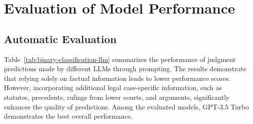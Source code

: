 \section{Evaluation of Model Performance}
% 
\subsection{Automatic Evaluation}
Table~\ref{tab:binary-classification-llm} summarizes the performance of judgment predictions made by different LLMs through prompting. The results demonstrate that relying solely on factual information leads to lower performance scores. However, incorporating additional legal case-specific information, such as statutes, precedents, rulings from lower courts, and arguments, significantly enhances the quality of predictions. Among the evaluated models, GPT-3.5 Turbo demonstrates the best overall performance.

